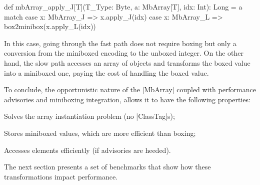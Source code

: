 \begin{lstlisting-nobreak}
 def mbArray_apply_J[T](T_Type: Byte, a: MbArray[T], idx: Int): Long =
   a match {
     case x: MbArray_J => x.apply_J(idx)
     case x: MbArray_L => box2minibox(x.apply_L(idx))
   }
\end{lstlisting-nobreak}

In this case, going through the fast path does not require boxing but only a conversion from the miniboxed encoding to the unboxed integer. On the other hand, the slow path accesses an array of objects and transforms the boxed value into a miniboxed one, paying the cost of handling the boxed value.


To conclude, the opportunistic nature of the |MbArray| coupled with performance advisories and miniboxing integration, allows it to have the following properties:
\begin{compactitem}
  \item Solves the array instantiation problem (no |ClassTag|s);
  \item Stores miniboxed values, which are more efficient than boxing;
  \item Accesses elements efficiently (if advisories are heeded).
\end{compactitem}

The next section presents a set of benchmarks that show how these transformations impact performance.

